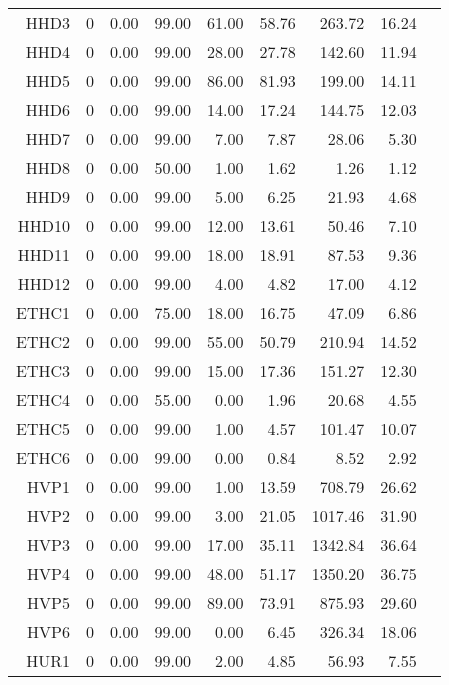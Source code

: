 \begin{longtable}{|rrrrrrrrr|}
	HHD3  &  0  &  0.00  &  99.00  &  61.00  &  58.76  &  263.72  &  16.24 & \\
	HHD4  &  0  &  0.00  &  99.00  &  28.00  &  27.78  &  142.60  &  11.94 & \\
	HHD5  &  0  &  0.00  &  99.00  &  86.00  &  81.93  &  199.00  &  14.11 & \\
	HHD6  &  0  &  0.00  &  99.00  &  14.00  &  17.24  &  144.75  &  12.03 & \\
	HHD7  &  0  &  0.00  &  99.00  &  7.00  &  7.87  &  28.06  &  5.30 & \\
	HHD8  &  0  &  0.00  &  50.00  &  1.00  &  1.62  &  1.26  &  1.12 & \\
	HHD9  &  0  &  0.00  &  99.00  &  5.00  &  6.25  &  21.93  &  4.68 & \\
	HHD10  &  0  &  0.00  &  99.00  &  12.00  &  13.61  &  50.46  &  7.10 & \\
	HHD11  &  0  &  0.00  &  99.00  &  18.00  &  18.91  &  87.53  &  9.36 & \\
	HHD12  &  0  &  0.00  &  99.00  &  4.00  &  4.82  &  17.00  &  4.12 & \\
	ETHC1  &  0  &  0.00  &  75.00  &  18.00  &  16.75  &  47.09  &  6.86 & \\
	ETHC2  &  0  &  0.00  &  99.00  &  55.00  &  50.79  &  210.94  &  14.52 & \\
	ETHC3  &  0  &  0.00  &  99.00  &  15.00  &  17.36  &  151.27  &  12.30 & \\
	ETHC4  &  0  &  0.00  &  55.00  &  0.00  &  1.96  &  20.68  &  4.55 & \\
	ETHC5  &  0  &  0.00  &  99.00  &  1.00  &  4.57  &  101.47  &  10.07 & \\
	ETHC6  &  0  &  0.00  &  99.00  &  0.00  &  0.84  &  8.52  &  2.92 & \\
	HVP1  &  0  &  0.00  &  99.00  &  1.00  &  13.59  &  708.79  &  26.62 & \\
	HVP2  &  0  &  0.00  &  99.00  &  3.00  &  21.05  &  1017.46  &  31.90 & \\
	HVP3  &  0  &  0.00  &  99.00  &  17.00  &  35.11  &  1342.84  &  36.64 & \\
	HVP4  &  0  &  0.00  &  99.00  &  48.00  &  51.17  &  1350.20  &  36.75 & \\
	HVP5  &  0  &  0.00  &  99.00  &  89.00  &  73.91  &  875.93  &  29.60 & \\
	HVP6  &  0  &  0.00  &  99.00  &  0.00  &  6.45  &  326.34  &  18.06 & \\
	HUR1  &  0  &  0.00  &  99.00  &  2.00  &  4.85  &  56.93  &  7.55 & \\

\end{longtable}
